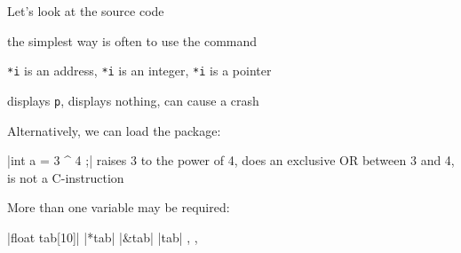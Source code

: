 \medskip
Let's look at the source code

the simplest way is often to use the command 

\begin{tkzexample}
 {{\texttt{*i} is an address},
 {\texttt{*i} is an integer},
 {\texttt{*i} is a pointer}}
\end{tkzexample}

\begin{tkzexample}
{{displays \texttt{p}},
 {displays nothing},
 {can cause a crash}}
\end{tkzexample}

Alternatively, we can load the  package:


\begin{tkzexample}
 \verbdef\argprop|int a = 3 ^ 4 ;|
 \AQquestion{\argprop}
 {{raises 3 to the power of 4},
 {does an exclusive OR between 3 and 4},
  {is not a C-instruction}}
\end{tkzexample}

More than one variable may be required:

\begin{tkzexample}
 \verbdef\arg|float tab[10]|
 \verbdef\propa|*tab|\global\let\propa\propa
 \verbdef\propb|&tab|\global\let\propb\propb
 \verbdef\propc|tab|\global\let\propc\propc
 {{\propa},
  {\propb},
  {\propc}}
\end{tkzexample}

\endinput